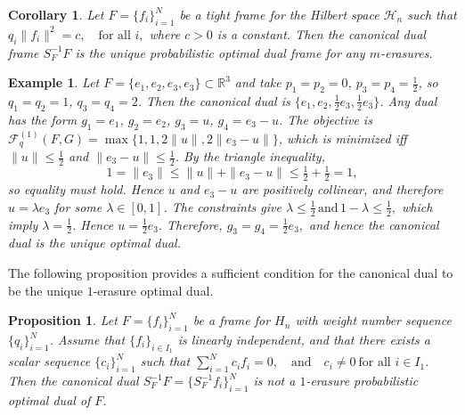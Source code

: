 \documentclass[final,1p,times]{elsarticle}
\newtheorem{prop}[thm]{Proposition}
\newtheorem{cor}[thm]{Corollary}
\newtheorem{example}[thm]{Example}
\begin{document}
	


\begin{cor}\label{cor3point2}
Let \( F = \{f_i\}_{i=1}^N \) be a tight frame for the Hilbert space \( \mathcal{H}_n \) such that $q_i\|f_i\|^2  = c, \quad \text{for all } i,$
where \( c > 0 \) is a constant. Then the canonical dual frame \( S_F^{-1}F \) is the unique probabilistic optimal dual frame for any \( m \)-erasures.
\end{cor}


\begin{example}
Let $F=\{e_1,e_2,e_3,e_3\}\subset \mathbb{R}^3$ and take $p_1=p_2=0$, $p_3=p_4=\tfrac12$, so $q_1=q_2=1$, $q_3=q_4=2$. Then the canonical dual is $\{e_1,e_2,\tfrac12 e_3,\tfrac12 e_3\}$. Any dual has the form $g_1=e_1$, $g_2=e_2$, $g_3=u$, $g_4=e_3-u$. The objective is $\mathcal{F}_q^{(1)}(F,G)=\max\{1,1,2\|u\|,2\|e_3-u\|\}$, which is minimized iff $\|u\|\le \tfrac12$ and $\|e_3-u\|\le \tfrac12$. By the triangle inequality,
\[
1=\|e_3\|\le \|u\|+\|e_3-u\|\le \tfrac12+\tfrac12=1,
\]
so equality must hold. Hence $u$ and $e_3-u$ are positively collinear, and therefore $u=\lambda e_3$ for some $\lambda\in[0,1]$. The constraints give
\(
\lambda\le \tfrac12 \,\text{and}\, 1-\lambda\le \tfrac12,
\)
which imply $\lambda=\tfrac12$. Hence
\(
u=\tfrac12 e_3.
\)
Therefore,
\(
g_3=g_4=\tfrac12 e_3,
\)
and hence the canonical dual is the unique optimal dual.
\end{example}


The following proposition provides a sufficient condition for the canonical dual to be the unique $1$-erasure optimal dual.






\begin{prop}\label{prop:canonical-not-prob-opt}
Let $F=\{f_i\}_{i=1}^N$ be a frame for $H_n$ with weight number sequence
$\{q_i\}_{i=1}^N$. Assume that $\{f_i\}_{i\in I_1}$ is linearly independent, and that there exists a scalar sequence $\{c_i\}_{i=1}^N$ such that $\sum_{i=1}^N c_i f_i=0, \quad\text{and}\quad c_i\neq 0 \ \text{for all } i\in I_1.$ Then the canonical dual $S_F^{-1}F=\{S_F^{-1}f_i\}_{i=1}^N$ is not a $1$-erasure probabilistic optimal dual of $F$.
\end{prop}
\end{document}
